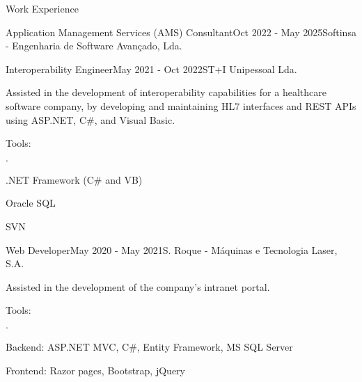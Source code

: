 \documentclass[a4paper]{resume} %
\begin{document}
\begin{rSection}{Work Experience}
\begin{rSubsection}{Application Management Services (AMS) Consultant}{Oct 2022 - May 2025}{Softinsa - Engenharia de Software Avançado, Lda.}{}
\end{rSubsection}

\vspace{1em}

\begin{rSubsection}{Interoperability Engineer}{May 2021 - Oct 2022}{ST+I Unipessoal Lda.}{}
    
    \item Assisted in the development of interoperability capabilities for a healthcare software company, by developing and maintaining HL7 interfaces and REST APIs using ASP.NET, C\#, and Visual Basic.
    
        \item Tools:
        \begin{list}{$\cdot$}{}
		      \setlength{\itemsep}{-0.5em} \vspace{-0.5em}
            \item .NET Framework (C\# and VB)
            \item Oracle SQL
            \item SVN
	    \end{list}

\end{rSubsection}

\vspace{1em}

\begin{rSubsection}{Web Developer}{May 2020 - May 2021}{S. Roque - Máquinas e Tecnologia Laser, S.A.}{}  

    \item Assisted in the development of the company’s intranet portal.
    \item Tools:
        \begin{list}{$\cdot$}{}
		      \setlength{\itemsep}{-0.5em} \vspace{-0.5em}
            \item Backend: ASP.NET MVC, C\#, Entity Framework, MS SQL Server
            \item Frontend: Razor pages, Bootstrap, jQuery
	    \end{list}

\end{rSubsection}

\end{rSection} 

\end{document}
